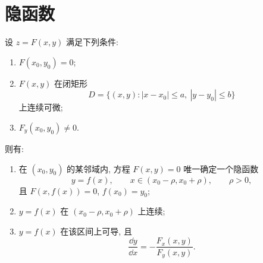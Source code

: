 \section{隐函数}

\begin{theorem}[隐函数存在定理]
	设 $z=F(x,y)$ 满足下列条件:
	\begin{enumerate}
		\item $F(x_0,y_0)=0$;
		\item $F(x,y)$ 在闭矩形
		\[
		D=\{(x,y):|x-x_0|\le a,\ |y-y_0|\le b\}
		\]
		上连续可微;
		\item $F_y(x_0,y_0)\ne0$.
	\end{enumerate}
	则有:
	\begin{enumerate}
		\item[(i)] 在 $(x_0,y_0)$ 的某邻域内, 方程 $F(x,y)=0$
		唯一确定一个隐函数
		\[
		y=f(x),\qquad x\in(x_0-\rho,x_0+\rho),\qquad \rho>0,
		\]
		且 $F(x,f(x))=0$, $f(x_0)=y_0$;
		\item[(ii)] $y=f(x)$ 在 $(x_0-\rho,x_0+\rho)$ 上连续;
		\item[(iii)] $y=f(x)$ 在该区间上可导, 且
		\[
		\frac{\dd y}{\dd x}
		=
		-\frac{F_x(x,y)}{F_y(x,y)}.
		\]
	\end{enumerate}
\end{theorem}

